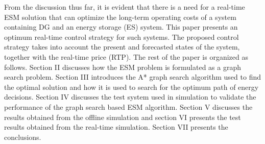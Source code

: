 From the discussion thus far, it is evident that there is a need for a real-time ESM solution that can optimize the long-term operating costs of a system containing DG and an energy storage (ES) system. This paper presents an optimum real-time control strategy for such systems. The proposed control strategy takes into account the present and forecasted states of the system, together with the real-time price (RTP). The rest of the paper is organized as follows. Section II discusses how the ESM problem is formulated as a graph search problem. Section III introduces the A* graph search algorithm used to find the optimal solution and how it is used to search for the optimum path of energy decisions. Section IV discusses the test system used in simulation to validate the performance of the graph search based ESM algorithm. Section V discusses the results obtained from the offline simulation and section VI presents the test results obtained from the real-time simulation. Section VII presents the conclusions.